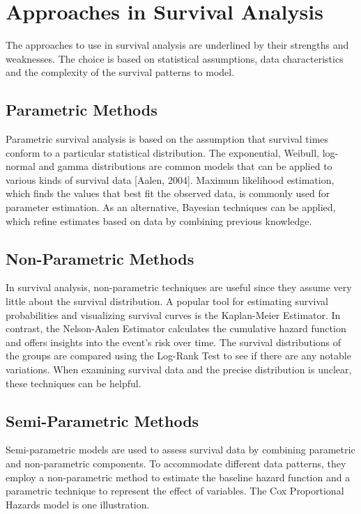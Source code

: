 \documentclass[doublespacing,12pt]{report}
\begin{document}
\section{Approaches in Survival Analysis}

The approaches to use in survival analysis are underlined by their strengths and weaknesses. The choice is based on statistical assumptions, data characteristics and the complexity of the survival patterns to model.

\subsection{Parametric Methods}

Parametric survival analysis is based on the assumption that survival times conform to a particular statistical distribution. The exponential, Weibull, log-normal and gamma distributions are common models that can be applied to various kinds of survival data [Aalen, 2004]. Maximum likelihood estimation, which finds the values that best fit the observed data, is commonly used for parameter estimation. As an alternative, Bayesian techniques can be applied, which refine estimates based on data by combining previous knowledge.

\subsection{Non-Parametric Methods}

In survival analysis, non-parametric techniques are useful since they assume very little about the survival distribution. A popular tool for estimating survival probabilities and visualizing survival curves is the Kaplan-Meier Estimator. In contrast, the Nelson-Aalen Estimator calculates the cumulative hazard function and offers insights into the event's risk over time. The survival distributions of the groups are compared using the Log-Rank Test to see if there are any notable variations. When examining survival data and the precise distribution is unclear, these techniques can be helpful.




\subsection{Semi-Parametric Methods}

Semi-parametric models are used to assess survival data by combining parametric and non-parametric components. To accommodate different data patterns, they employ a non-parametric method to estimate the baseline hazard function and a parametric technique to represent the effect of variables. The Cox Proportional Hazards model is one illustration.
\end{document}
